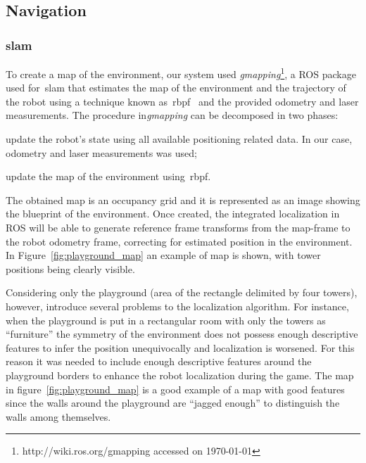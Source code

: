 
\subsection{Navigation}\label{sec:navigation}
\subsubsection{\glsdesc{slam}}\label{gmapping}
To create a map of the environment, our system used \textit{gmapping}\footnote{http://wiki.ros.org/gmapping accessed on \today}, a ROS package used for~\gls{slam} that estimates the map of the environment and the trajectory of the robot using a technique known as~\gls{rbpf}~\citep{grisettiyz_improving_2005} and the provided odometry and laser measurements. The procedure in\textit{gmapping} can be decomposed in two phases: \begin{inparaenum}\item update the robot's state using all available positioning related data. In our case, odometry and laser measurements was used; \item update the map of the environment using~\gls{rbpf}.\end{inparaenum}

The obtained map is an occupancy grid and it is represented as an image showing the blueprint of the environment. Once created, the integrated localization in ROS will be able to generate reference frame transforms from the map-frame to the robot odometry frame, correcting for estimated position in the environment. In Figure~\ref{fig:playground_map} an example of map is shown, with tower positions being clearly visible.

Considering only the playground (area of the rectangle delimited by four towers), however, introduce several problems to the localization algorithm. For instance, when the playground is put in a rectangular room with only the towers as ``furniture'' the symmetry of the environment does not possess enough descriptive features to infer the position unequivocally and localization is worsened. For this reason it was needed to include enough descriptive features around the playground borders to enhance the robot localization during the game. The map in figure~\ref{fig:playground_map} is a good example of a map with good features since the walls around the playground are ``jagged enough'' to distinguish the walls among themselves. 

